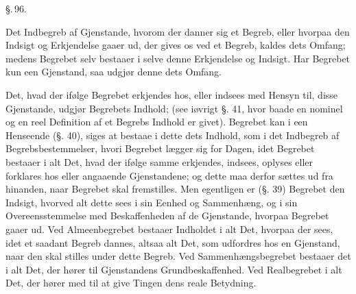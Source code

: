 \documentclass[12pt]{book}
\def\textit#1{#1}%
\def\emph#1{#1}%
\newcommand{\parag}[1]{%
  \par\vspace{0.9\baselineskip}%
  {\centering\textit{\S.\,#1.}\par}%
  \vspace{0.35\baselineskip}%
  \noindent\hspace{\parindent}\ignorespaces
}
\newcommand{\opage}[1]{\marginnote{\footnotesize\textit{[#1]}}}
\begin{document}
\parag{96}

Det Indbegreb af Gjenstande, hvorom der danner sig et Begreb, eller hvorpaa den Indsigt
og Erkjendelse gaaer ud, der gives os ved et Begreb, kaldes dets \emph{Omfang}; medens
Begrebet selv bestaaer i selve denne Erkjendelse og Indsigt. Har Begrebet kun een
Gjenstand, saa udgjør denne dets Omfang.

Det, hvad der ifølge Begrebet erkjendes hos, eller indsees med Hensyn til, disse
Gjenstande, udgjør Begrebets \emph{Indhold}; (see iøvrigt §. 41, hvor baade en nominel
og en reel Definition af et Begrebs Indhold er givet). Begrebet kan i een Henseende
(§. 40), siges at bestaae i dette dets Indhold, som i det Indbegreb af
Begrebsbestemmelser, hvori Begrebet lægger sig for Dagen, idet Begrebet bestaaer i alt
Det, hvad der ifølge samme erkjendes, indsees, oplyses eller forklares hos eller
angaaende Gjenstandene; og dette maa derfor sættes ud fra hinanden, naar Begrebet skal
fremstilles. Men egentligen er (§. 39) Begrebet den Indsigt, hvorved alt dette sees i
sin Eenhed og Sammenhæng, og i sin Overeensstemmelse med Beskaffenheden af de
Gjenstande, hvorpaa Begrebet gaaer ud.
\opage{242} Ved Almeenbegrebet bestaaer Indholdet i alt Det, hvorpaa der sees, idet et saadant
Begreb dannes, altsaa alt Det, som udfordres hos en Gjenstand, naar den skal stilles
under dette Begreb. Ved Sammenhængsbegrebet bestaaer det i alt Det, der hører til
Gjenstandens Grundbeskaffenhed. Ved Realbegrebet i alt Det, der hører med til at give
Tingen dens reale Betydning.
\end{document}
